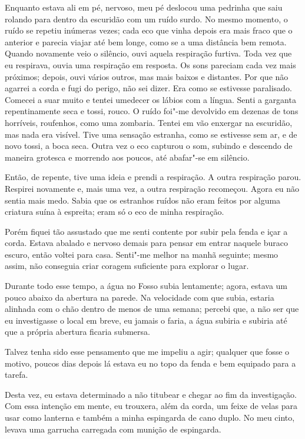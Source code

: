 Enquanto estava ali em pé, nervoso, meu pé deslocou uma pedrinha que saiu rolando para dentro da escuridão com um ruído
surdo. No mesmo momento, o ruído se repetiu inúmeras vezes; cada eco que vinha depois era mais fraco que o anterior e
parecia viajar até bem longe, como se a uma distância bem remota. Quando novamente veio o silêncio, ouvi aquela
respiração furtiva. Toda vez que eu respirava, ouvia uma respiração em resposta. Os sons pareciam cada vez mais
próximos; depois, ouvi vários outros, mas mais baixos e distantes. Por que não agarrei a corda e fugi do perigo, não
sei dizer. Era como se estivesse paralisado. Comecei a suar muito e tentei umedecer os lábios com a língua.
Senti a garganta repentinamente seca e tossi, rouco. O ruído foi"-me devolvido em dezenas de tons horríveis, roufenhos,
como uma zombaria. Tentei em vão enxergar na escuridão, mas nada era visível. Tive uma sensação estranha, como se
estivesse sem ar, e de novo tossi, a boca seca. Outra vez o eco capturou o som, subindo e descendo de maneira
grotesca e morrendo aos poucos, até abafar"-se em silêncio.

Então, de repente, tive uma ideia e prendi a respiração. A outra respiração parou. Respirei novamente e, mais uma
vez, a outra respiração recomeçou. Agora eu não sentia mais medo. Sabia que os estranhos ruídos não eram feitos por
alguma criatura suína à espreita; eram só o eco de minha respiração.

Porém fiquei tão assustado que me senti contente por subir pela fenda e içar a corda. Estava abalado e nervoso demais
para pensar em entrar naquele buraco escuro, então voltei para casa. Senti"-me melhor na manhã seguinte; mesmo
assim, não conseguia criar coragem suficiente para explorar o lugar.

Durante todo esse tempo, a água no Fosso subia lentamente; agora, estava um pouco abaixo da abertura na parede. Na
velocidade com que subia, estaria alinhada com o chão dentro de menos de uma semana; percebi que, a não ser que eu
investigasse o local em breve, eu jamais o faria, a água subiria e subiria até que a própria abertura ficaria
submersa.

Talvez tenha sido esse pensamento que me impeliu a agir; qualquer que fosse o motivo, poucos dias depois lá estava eu no
topo da fenda e bem equipado para a tarefa.

Desta vez, eu estava determinado a não titubear e chegar ao fim da investigação. Com essa intenção em mente, eu trouxera,
além da corda, um feixe de velas para usar como lanterna e também a minha espingarda de cano duplo. No meu cinto,
levava uma garrucha carregada com munição de espingarda.

